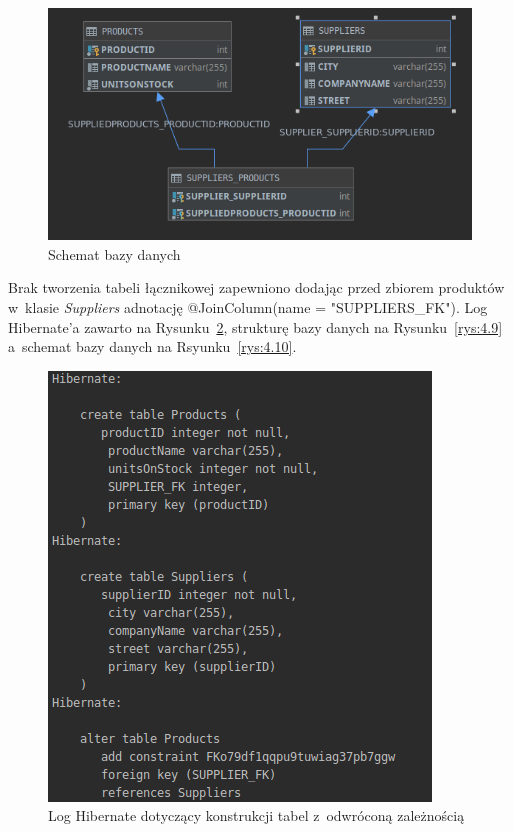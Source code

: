 \documentclass[12pt, a4paper]{mwart}
\begin{document}
\clearpage
\begin{figure}[ht]
  \centering
  \includegraphics[scale=0.5]{IV/4-7.png}
  \caption{Schemat bazy danych}
  \label{rys:4.7}
\end{figure}

Brak tworzenia tabeli łącznikowej zapewniono dodając przed zbiorem produktów w~klasie \textit{Suppliers} adnotację @JoinColumn(name = "SUPPLIERS\_FK"). Log Hibernate'a zawarto na Rysunku~\ref{rys:4.8}, strukturę bazy danych na Rysunku~\ref{rys:4.9} a~schemat bazy danych na Rsyunku~\ref{rys:4.10}.

\begin{figure}[ht]
  \centering
  \includegraphics[scale=0.75]{IV/4-8.png}
  \caption{Log Hibernate dotyczący konstrukcji tabel z~odwróconą zależnością}
  \label{rys:4.8}
\end{figure}
\end{document}
